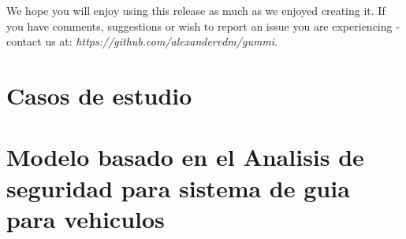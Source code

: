 \documentclass[11pt]{article}
\begin{document}
We hope you will enjoy using this release as much as we enjoyed creating it. If you have comments, suggestions or wish to report an issue you are experiencing - contact us at: \emph{https://github.com/alexandervdm/gummi}.

\section{Casos de estudio}


\section{Modelo basado en el Analisis de seguridad para sistema de guia para vehiculos}
\end{document}
